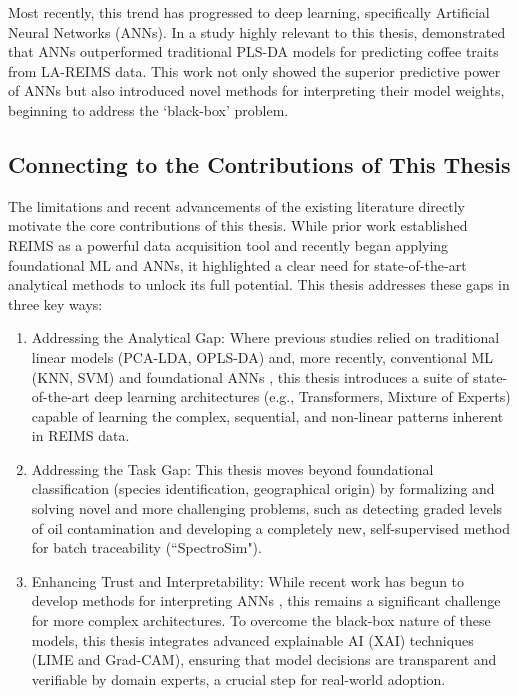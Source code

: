 Most recently, this trend has progressed to deep learning, specifically Artificial Neural Networks (ANNs). In a study highly relevant to this thesis, \cite{Cardoso2025} demonstrated that ANNs outperformed traditional PLS-DA models for predicting coffee traits from LA-REIMS data. This work not only showed the superior predictive power of ANNs but also introduced novel methods for interpreting their model weights, beginning to address the `black-box' problem.

\subsection{Connecting to the Contributions of This Thesis}

The limitations and recent advancements of the existing literature directly motivate the core contributions of this thesis. While prior work established REIMS as a powerful data acquisition tool and recently began applying foundational ML and ANNs, it highlighted a clear need for state-of-the-art analytical methods to unlock its full potential. This thesis addresses these gaps in three key ways:

\begin{enumerate}
    \item Addressing the Analytical Gap: Where previous studies relied on traditional linear models (PCA-LDA, OPLS-DA) and, more recently, conventional ML (KNN, SVM) and foundational ANNs \citep{Cardoso2025}, this thesis introduces a suite of state-of-the-art deep learning architectures (e.g., Transformers, Mixture of Experts) capable of learning the complex, sequential, and non-linear patterns inherent in REIMS data.
    \item Addressing the Task Gap: This thesis moves beyond foundational classification (species identification, geographical origin) by formalizing and solving novel and more challenging problems, such as detecting graded levels of oil contamination and developing a completely new, self-supervised method for batch traceability (``SpectroSim").
    \item Enhancing Trust and Interpretability: While recent work has begun to develop methods for interpreting ANNs \citep{Cardoso2025}, this remains a significant challenge for more complex architectures. To overcome the black-box nature of these models, this thesis integrates advanced explainable AI (XAI) techniques (LIME and Grad-CAM), ensuring that model decisions are transparent and verifiable by domain experts, a crucial step for real-world adoption.
\end{enumerate}

